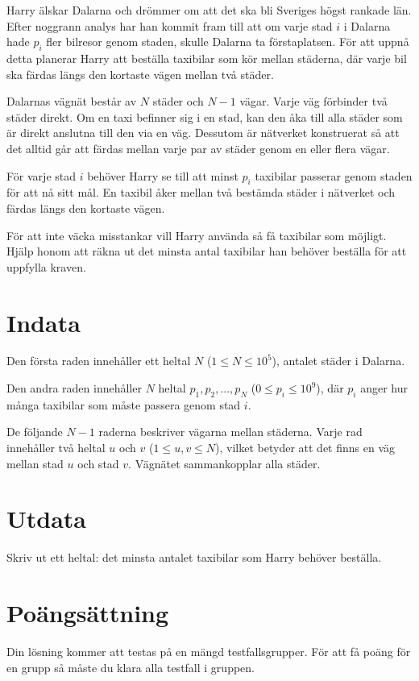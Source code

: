 
\noindent
Harry älskar Dalarna och drömmer om att det ska bli Sveriges högst rankade län. 
Efter noggrann analys har han kommit fram till att om varje stad $i$ i Dalarna hade $p_i$ fler bilresor genom staden, 
skulle Dalarna ta förstaplatsen. För att uppnå detta planerar Harry att beställa taxibilar som kör mellan städerna, 
där varje bil ska färdas längs den kortaste vägen mellan två städer.

Dalarnas vägnät består av $N$ städer och $N-1$ vägar. Varje väg förbinder två städer direkt. Om en taxi befinner sig i en stad, 
kan den åka till alla städer som är direkt anslutna till den via en väg. Dessutom är nätverket konstruerat så att det alltid går att färdas mellan varje par av städer genom en eller flera vägar.

För varje stad $i$ behöver Harry se till att minst $p_i$ taxibilar passerar genom staden för att nå sitt mål. 
En taxibil åker mellan två bestämda städer i nätverket och färdas längs den kortaste vägen.

För att inte väcka misstankar vill Harry använda så få taxibilar som möjligt. 
Hjälp honom att räkna ut det minsta antal taxibilar han behöver beställa för att uppfylla kraven.


\section*{Indata}
Den första raden innehåller ett heltal $N$ ($1 \le N \le 10^5$), antalet städer i Dalarna.

Den andra raden innehåller $N$ heltal $p_1, p_2, ..., p_N$ ($0 \le p_i \le 10^9$), där $p_i$
anger hur många taxibilar som måste passera genom stad $i$.

De följande $N-1$ raderna beskriver vägarna mellan städerna. Varje rad innehåller två heltal $u$ och $v$
($1 \le u, v \le N$), vilket betyder att det finns en väg mellan stad $u$ och stad $v$.
Vägnätet sammankopplar alla städer.

\section*{Utdata}
Skriv ut ett heltal: det minsta antalet taxibilar som Harry behöver beställa.

\section*{Poängsättning}
Din lösning kommer att testas på en mängd testfallsgrupper.
För att få poäng för en grupp så måste du klara alla testfall i gruppen.

